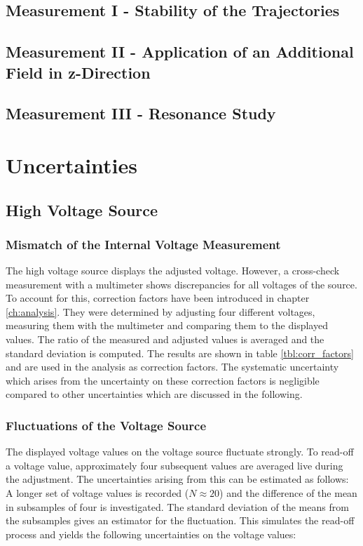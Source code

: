 \documentclass[
	paper=A4,
	parskip=full,
	chapterprefix=true,
	11pt,
	headings=normal,
	bibliography=totoc,
	listof=totoc,
	titlepage=on,
]{scrreprt}
\begin{document}
\section{Measurement I - Stability of the Trajectories}
\section{Measurement II - Application of an Additional Field in z-Direction}
\section{Measurement III - Resonance Study}

\chapter{Uncertainties}
\label{ch:systematics}
\section{High Voltage Source}
\subsection{Mismatch of the Internal Voltage Measurement}
The high voltage source displays the adjusted voltage. However, a cross-check measurement with a multimeter shows discrepancies for all voltages of the source. To account for this, correction factors have been introduced in chapter \ref{ch:analysis}. They were determined by adjusting four different voltages, measuring them with the multimeter and comparing them to the displayed values. The ratio of the measured and adjusted values is averaged and the standard deviation is computed. The results are shown in table \ref{tbl:corr_factors} and are used in the analysis as correction factors. The systematic uncertainty which arises from the uncertainty on these correction factors is negligible compared to other uncertainties which are discussed in the following.

\subsection{Fluctuations of the Voltage Source}
The displayed voltage values on the voltage source fluctuate strongly. To read-off a voltage value, approximately four subsequent values are averaged live during the adjustment. The uncertainties arising from this can be estimated as follows: A longer set of voltage values is recorded ($N\approx20$) and the difference of the mean in subsamples of four is investigated. The standard deviation of the means from the subsamples gives an estimator for the fluctuation. This simulates the read-off process and yields the following uncertainties on the voltage values:
\end{document}
